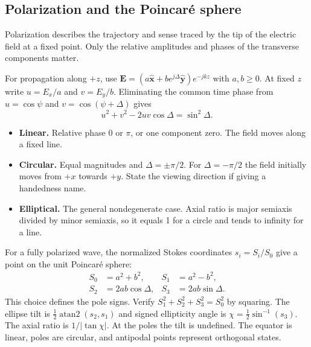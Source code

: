 \documentclass[12pt,a4paper]{article}
\begin{document}
\subsection{Polarization and the Poincar\'e sphere}
\begin{tcolorbox}[defbox,title={Polarization}]
Polarization describes the trajectory and sense traced by the tip of the electric field at a fixed point. Only the relative amplitudes and phases of the transverse components matter.
\end{tcolorbox}

For propagation along $+z$, use $\mathbf E=(a\hat{\mathbf x}+be^{j\Delta}\hat{\mathbf y})e^{-jkz}$ with $a,b\ge0$. At fixed $z$ write $u=E_x/a$ and $v=E_y/b$. Eliminating the common time phase from $u=\cos\psi$ and $v=\cos(\psi+\Delta)$ gives
\[
u^2+v^2-2uv\cos\Delta=\sin^2\Delta .
\]
\begin{itemize}[leftmargin=*,itemsep=3pt]
\item \textbf{Linear.} Relative phase $0$ or $\pi$, or one component zero. The field moves along a fixed line.
\item \textbf{Circular.} Equal magnitudes and $\Delta=\pm\pi/2$. For $\Delta=-\pi/2$ the field initially moves from $+x$ towards $+y$. State the viewing direction if giving a handedness name.
\item \textbf{Elliptical.} The general nondegenerate case. Axial ratio is major semiaxis divided by minor semiaxis, so it equals 1 for a circle and tends to infinity for a line.
\end{itemize}
For a fully polarized wave, the normalized Stokes coordinates $s_i=S_i/S_0$ give a point on the unit Poincar\'e sphere:
\[
\begin{aligned}
S_0 &= a^2+b^2,&S_1 &=a^2-b^2,\\
S_2 &=2ab\cos\Delta,& S_3 &=2ab\sin\Delta .
\end{aligned}
\]
This choice defines the pole signs. Verify $S_1^2+S_2^2+S_3^2=S_0^2$ by squaring. The ellipse tilt is $\tfrac12\operatorname{atan2}(s_2,s_1)$ and signed ellipticity angle is $\chi=\tfrac12\sin^{-1}(s_3)$. The axial ratio is $1/|\tan\chi|$. At the poles the tilt is undefined. The equator is linear, poles are circular, and antipodal points represent orthogonal states.
\begin{tcolorbox}[tikzbox,title={Poincar\'e sphere for the stated Stokes convention},unbreakable]
\centering
{}
\end{tcolorbox}
\end{document}
